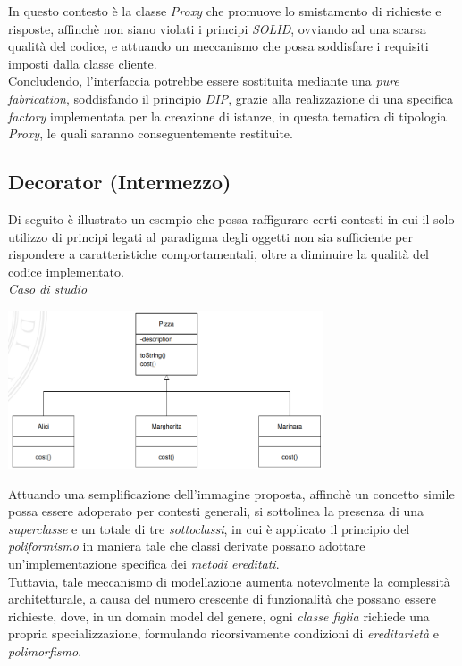 \documentclass{article}
\begin{document}
In questo contesto è la classe \textit{Proxy} che promuove lo smistamento di richieste e risposte, affinchè non siano violati i principi \textit{SOLID}, ovviando ad una scarsa qualità del codice, e attuando un meccanismo che possa soddisfare i requisiti imposti dalla classe cliente.\vspace*{14pt}\\
Concludendo, l'interfaccia potrebbe essere sostituita mediante una \textit{pure fabrication}, soddisfando il principio \textit{DIP}, grazie alla realizzazione di una specifica \textit{factory} implementata per la creazione di istanze, in questa tematica di tipologia \textit{Proxy}, le quali saranno conseguentemente restituite.

\subsection*{Decorator (Intermezzo)}
\large
Di seguito è illustrato un esempio che possa raffigurare certi contesti in cui il solo utilizzo di principi legati al paradigma degli oggetti non sia sufficiente per rispondere a caratteristiche comportamentali, oltre a diminuire la qualità del codice implementato.\vspace*{14pt}\\
\textit{Caso di studio}\\
\begin{center}
    \includegraphics[width=0.7\textwidth]{foto 2.png}
\end{center}
Attuando una semplificazione dell'immagine proposta, affinchè un concetto simile possa essere adoperato per contesti generali, si sottolinea la presenza di una \textit{superclasse} e un totale di tre \textit{sottoclassi}, in cui è applicato il principio del \textit{poliformismo} in maniera tale che classi derivate possano adottare un'implementazione specifica dei \textit{metodi ereditati}.\\
Tuttavia, tale meccanismo di modellazione aumenta notevolmente la complessità architetturale, a causa del numero crescente di funzionalità che possano essere richieste, dove, in un domain model del genere, ogni \textit{classe figlia} richiede una propria specializzazione, formulando ricorsivamente condizioni di \textit{ereditarietà} e \textit{polimorfismo}.\vspace*{3pt}  
\end{document}
